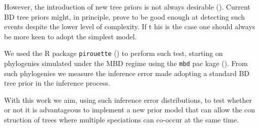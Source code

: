 However, the introduction of new tree priors is not always desirable (\citep{bil
derbeek2019pirouette}). Current BD tree priors might, in principle, prove to be 
good enough at detecting such events despite the lower level of complexity. If t
his is the case one should always be more keen to adopt the simplest model.

We used the R package \verb;pirouette; (\citep{pirouette}) to perform such test,
 starting on phylogenies simulated under the MBD regime using the \verb;mbd; pac
kage (\citep{mbd}).
From such phylogenies we measure the inference error made adopting a standard BD
 tree prior in the inference process.

With this work we aim, using such inference error distributions, to test whether
 or not it is advantageous to implement a new prior model that can allow the con
struction of trees where multiple speciations can co-occur at the same time.
